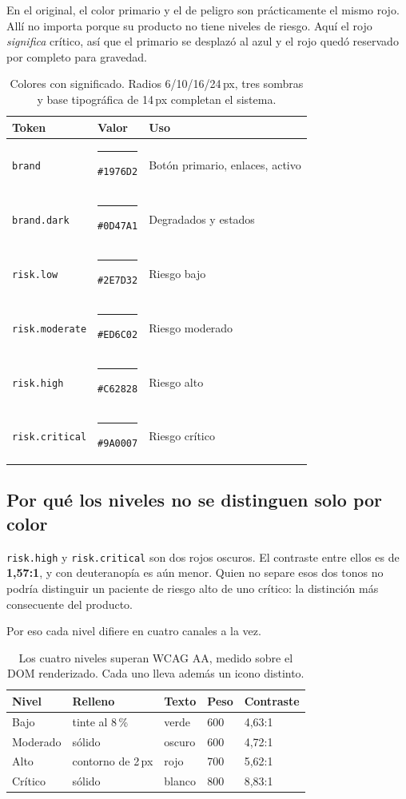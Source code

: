 \documentclass[11pt,a4paper]{article}
\begin{document}
En el original, el color primario y el de peligro son prácticamente el mismo
rojo. Allí no importa porque su producto no tiene niveles de riesgo. Aquí el
rojo \emph{significa} crítico, así que el primario se desplazó al azul y el
rojo quedó reservado por completo para gravedad.

\begin{table}[htbp]\centering
\begin{tabular}{@{}llp{5.6cm}@{}}
\toprule
\textbf{Token} & \textbf{Valor} & \textbf{Uso} \\
\midrule
\texttt{brand} & \textcolor{brand}{\rule{2.4ex}{1.6ex}} \texttt{\#1976D2} & Botón primario, enlaces, activo \\
\texttt{brand.dark} & \textcolor{brandDark}{\rule{2.4ex}{1.6ex}} \texttt{\#0D47A1} & Degradados y estados \\
\texttt{risk.low} & \textcolor{riesgoBajo}{\rule{2.4ex}{1.6ex}} \texttt{\#2E7D32} & Riesgo bajo \\
\texttt{risk.moderate} & \textcolor{riesgoModerado}{\rule{2.4ex}{1.6ex}} \texttt{\#ED6C02} & Riesgo moderado \\
\texttt{risk.high} & \textcolor{riesgoAlto}{\rule{2.4ex}{1.6ex}} \texttt{\#C62828} & Riesgo alto \\
\texttt{risk.critical} & \textcolor{riesgoCritico}{\rule{2.4ex}{1.6ex}} \texttt{\#9A0007} & Riesgo crítico \\
\bottomrule
\end{tabular}
\caption{Colores con significado. Radios 6/10/16/24\,px, tres sombras y base
tipográfica de 14\,px completan el sistema.}
\end{table}

\subsection{Por qué los niveles no se distinguen solo por color}

\texttt{risk.high} y \texttt{risk.critical} son dos rojos oscuros. El
contraste entre ellos es de \textbf{1{,}57:1}, y con deuteranopía es aún
menor. Quien no separe esos dos tonos no podría distinguir un paciente de
riesgo alto de uno crítico: la distinción más consecuente del producto.

Por eso cada nivel difiere en cuatro canales a la vez.

\begin{table}[htbp]\centering
\begin{tabular}{@{}lllll@{}}
\toprule
\textbf{Nivel} & \textbf{Relleno} & \textbf{Texto} & \textbf{Peso} & \textbf{Contraste} \\
\midrule
Bajo & tinte al 8\,\% & verde & 600 & 4{,}63:1 \\
Moderado & sólido & oscuro & 600 & 4{,}72:1 \\
Alto & contorno de 2\,px & rojo & 700 & 5{,}62:1 \\
Crítico & sólido & blanco & 800 & 8{,}83:1 \\
\bottomrule
\end{tabular}
\caption{Los cuatro niveles superan WCAG AA, medido sobre el DOM renderizado.
Cada uno lleva además un icono distinto.}
\end{table}
\end{document}
